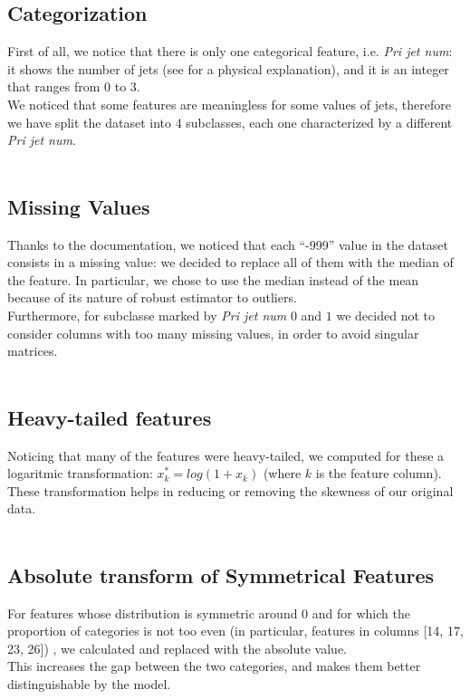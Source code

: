 \documentclass[10pt,conference,compsocconf]{IEEEtran}
\begin{document}
\subsection{Categorization}
First of all, we notice that there is only one categorical feature, i.e. \textit{Pri jet num}: it shows the number of jets (see \cite{higgs} for a physical explanation), and it is an integer that ranges from 0 to 3. \\
We noticed that some features are meaningless for some values of jets, therefore we have split the dataset into 4 subclasses, each one characterized by a different \textit{Pri jet num}.\\
\vspace{-0.7cm}\\

\subsection{Missing Values}
Thanks to the documentation, we noticed that each “-999” value
in the dataset consists in a missing value: we decided to replace all of them with the median of the feature. In particular, we chose to use the median instead of the mean because of its nature of robust estimator to outliers.\\
Furthermore, for subclasse marked by \textit{Pri jet num} $0$ and $1$ we decided not to consider columns with too many missing values, in order to avoid singular matrices.\\
\vspace{-0.7cm}\\

\subsection{Heavy-tailed features}
Noticing that many of the features were heavy-tailed, we
computed for these a logaritmic transformation: $x_{k}^{*} = log(1+x_k)$ (where $k$ is the feature column). These transformation  helps in reducing or removing the skewness of our original data.\\
\vspace{-0.7cm}\\

\subsection{Absolute transform of Symmetrical Features}
For features whose distribution is symmetric around 0 and
for which the proportion of categories is not too even (in particular, features in columns [14, 17, 23, 26]) , we calculated and replaced with the absolute value.\\
This increases the gap between the two categories, and makes them better distinguishable by the model. \\
\vspace{-0.7cm}\\
\end{document}
